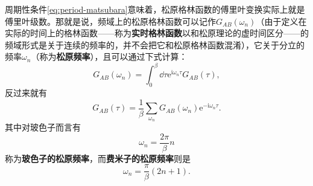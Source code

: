 \documentclass[hyperref, UTF8, a4paper]{ctexart}
\newcommand*{\ii}{\mathrm{i}}
\newcommand*{\ee}{\mathrm{e}}
\begin{document}
周期性条件\eqref{eq:period-matsubara}意味着，松原格林函数的傅里叶变换实际上就是傅里叶级数。那就是说，频域上的松原格林函数可以记作$G_{AB}(\omega_n)$（由于定义在实际的时间上的格林函数——称为\textbf{实时格林函数}以和松原理论的虚时间区分——的频域形式是关于连续的频率的，并不会把它和松原格林函数混淆），它关于分立的频率$\omega_n$（称为\textbf{松原频率}），且可以通过下式计算：
\begin{equation}
    G_{AB}(\omega_n) = \int_0^\beta \dd{\tau} \ee^{\ii \omega_n \tau} G_{AB}(\tau),
\end{equation}
反过来就有
\begin{equation}
    G_{AB}(\tau) = \frac{1}{\beta} \sum_{\omega_n} G_{AB}(\omega_n) \ee^{- \ii \omega_n \tau}.
\end{equation}
其中对玻色子而言有
\begin{equation}
    \omega_n = \frac{2\pi}{\beta} n
\end{equation}
称为\textbf{玻色子的松原频率}，而\textbf{费米子的松原频率}则是
\begin{equation}
    \omega_n = \frac{\pi}{\beta} (2n+1).
\end{equation}
\end{document}
